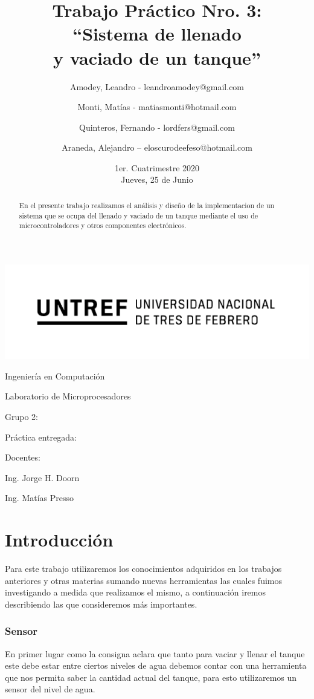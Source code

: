 \documentclass[a4paper]{article}
\title{Trabajo Práctico Nro. 3:\\``Sistema de llenado\\y vaciado de un tanque''}
\author{Amodey, Leandro - leandroamodey@gmail.com
\and Monti, Matías - matiasmonti@hotmail.com
\and Quinteros, Fernando - lordfers@gmail.com
\and Araneda, Alejandro – eloscurodeefeso@hotmail.com}
\date{1er. Cuatrimestre 2020\\Jueves, 25 de Junio}
\def\teacher{Ing. Jorge H. Doorn
\and Ing. Matías Presso}
\begin{document}
\begin{titlepage}\renewcommand\and\par\centering\makeatletter
    \includegraphics{logo.png}\par
    {\Large Ingeniería en Computación \par}\vspace{0.5cm}
    {\LARGE Laboratorio de Microprocesadores \par}\vfill
    {\huge \@title \par}\vfill
    Grupo 2:\par
    \@author\vfill
    Práctica entregada:\par
    \@date\vfill
    Docentes:\par
    \teacher\vspace{1cm}\makeatother
\end{titlepage}

\begin{abstract}

    En el presente trabajo realizamos el análisis y diseño de la
    implementacion de un sistema que se ocupa del llenado y vaciado 
    de un tanque mediante el uso de microcontroladores y otros 
    componentes electrónicos.

\end{abstract}

\section{Introducción}

Para este trabajo utilizaremos los conocimientos adquiridos en los 
trabajos anteriores y otras materias sumando nuevas herramientas las
 cuales fuimos investigando a medida que realizamos el mismo, a
 continuación iremos describiendo las que consideremos más importantes.

\subsubsection*{Sensor}

En primer lugar como la consigna aclara que tanto para vaciar y llenar 
el tanque este debe estar entre ciertos niveles de agua debemos contar 
con una herramienta que nos permita saber la cantidad actual del tanque,
 para esto utilizaremos un sensor del nivel de agua.
\end{document}
